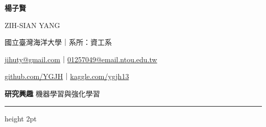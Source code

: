 \documentclass[10pt,a4paper]{article}
\begin{document}
\color{ink}

{\color{navy}\fontsize{24}{30}\selectfont\bfseries 楊子賢}\par
\vspace{3pt}
{\color{muted}\fontsize{10}{13}\selectfont ZIH-SIAN YANG}\par
\vspace{6pt}
{\color{muted}\fontsize{8.8}{11.8}\selectfont
國立臺灣海洋大學｜系所：資工系\par
\href{mailto:jihuty@gmail.com}{jihuty@gmail.com}｜\href{mailto:01257049@email.ntou.edu.tw}{01257049@email.ntou.edu.tw}\par
\href{https://github.com/YGJH}{github.com/YGJH}｜\href{https://www.kaggle.com/ygjh13}{kaggle.com/ygjh13}}

\vspace{6pt}
{\color{navy}\fontsize{9.2}{12.3}\selectfont\bfseries 研究興趣}\enspace
{\color{muted}\fontsize{9.2}{12.3}\selectfont 機器學習與強化學習}\par
\vspace{6pt}
{\color{teal}\hrule height 2pt}
\vspace{8pt}

\fontsize{9.2}{12.3}\selectfont

\vspace{5pt}
\end{document}
